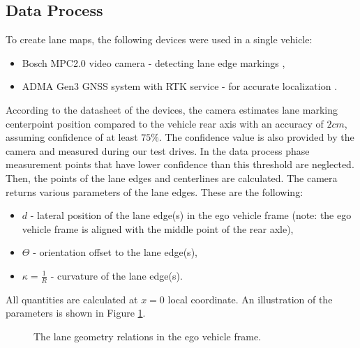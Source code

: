\documentclass[sn-mathphys-num]{sn-jnl}%
\begin{document}
\subsection{Data Process}
To create lane maps, the following devices were used in a single vehicle:
\begin{itemize}
    \item Bosch MPC2.0 video camera - detecting lane edge markings \cite{mpc25},
    \item ADMA Gen3 GNSS system with RTK service - for accurate localization \cite{adma}.
\end{itemize}
According to the datasheet of the devices, the camera estimates lane marking centerpoint position compared to the vehicle rear axis with an accuracy of $2 cm$, 
assuming confidence of at least $75\%$. The confidence value is also provided by the camera and measured during our test drives. In the data process phase 
measurement points that have lower confidence than this threshold are neglected. Then, the points of the lane edges and centerlines are calculated. 
The camera returns various parameters of the lane edges. These are the following:
\begin{itemize}
    \item $d$ - lateral position of the lane edge(s) in the ego vehicle frame (note: the ego vehicle frame is aligned with the middle point of the rear axle),
    \item $\Theta$ - orientation offset to the lane edge(s),
    \item $\kappa = \frac{1}{R}$ - curvature of the lane edge(s).
\end{itemize}
All quantities are calculated at $x=0$ local coordinate. An illustration of the parameters is shown in Figure \ref{fig:lanegeometry}.
\begin{figure}[h]
    \caption{The lane geometry relations in the ego vehicle frame.}
    \label{fig:lanegeometry}
\end{figure}
\end{document}
